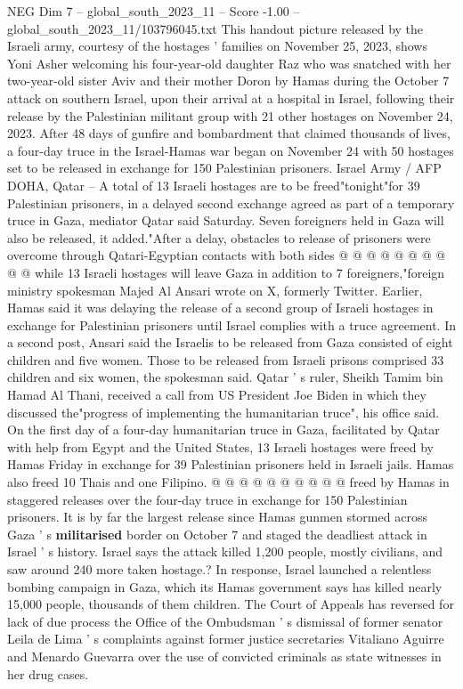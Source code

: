 \begin{textsample}{NEG Dim 7 – global\_south\_2023\_11 – Score -1.00 – global\_south\_2023\_11/103796045.txt}  \label{ex:f7_neg_153}
This handout picture released by the Israeli army, courtesy of the hostages ' families on November 25, 2023, shows Yoni Asher welcoming his four-year-old daughter Raz who was snatched with her two-year-old sister Aviv and their mother Doron by Hamas during the October 7 attack on southern Israel, upon their arrival at a hospital in Israel, following their release by the Palestinian militant group with 21 other hostages on November 24, 2023.
After 48 days of gunfire and bombardment that claimed thousands of lives, a four-day truce in the Israel-Hamas war began on November 24 with 50 hostages set to be released in exchange for 150 Palestinian prisoners.
Israel Army / AFP DOHA, Qatar -- A total of 13 Israeli hostages are to be freed"tonight"for 39 Palestinian prisoners, in a delayed second exchange agreed as part of a temporary truce in Gaza, mediator Qatar said Saturday.
Seven foreigners held in Gaza will also be released, it added."After a delay, obstacles to release of prisoners were overcome through Qatari-Egyptian contacts with both sides @ @ @ @ @ @ @ @ @ @ while 13 Israeli hostages will leave Gaza in addition to 7 foreigners,"foreign ministry spokesman Majed Al Ansari wrote on X, formerly Twitter.
Earlier, Hamas said it was delaying the release of a second group of Israeli hostages in exchange for Palestinian prisoners until Israel complies with a truce agreement.
In a second post, Ansari said the Israelis to be released from Gaza consisted of eight children and five women.
Those to be released from Israeli prisons comprised 33 children and six women, the spokesman said.
Qatar ' s ruler, Sheikh Tamim bin Hamad Al Thani, received a call from US President Joe Biden in which they discussed the"progress of implementing the humanitarian truce", his office said.
On the first day of a four-day humanitarian truce in Gaza, facilitated by Qatar with help from Egypt and the United States, 13 Israeli hostages were freed by Hamas Friday in exchange for 39 Palestinian prisoners held in Israeli jails.
Hamas also freed 10 Thais and one Filipino. @ @ @ @ @ @ @ @ @ @ freed by Hamas in staggered releases over the four-day truce in exchange for 150 Palestinian prisoners.
It is by far the largest release since Hamas gunmen stormed across Gaza ' s \textbf{militarised} border on October 7 and staged the deadliest attack in Israel ' s history.
Israel says the attack killed 1,200 people, mostly civilians, and saw around 240 more taken hostage.?
In response, Israel launched a relentless bombing campaign in Gaza, which its Hamas government says has killed nearly 15,000 people, thousands of them children.
The Court of Appeals has reversed for lack of due process the Office of the Ombudsman ' s dismissal of former senator Leila de Lima ' s complaints against former justice secretaries Vitaliano Aguirre and Menardo Guevarra over the use of convicted criminals as state witnesses in her drug cases.

\end{textsample}
